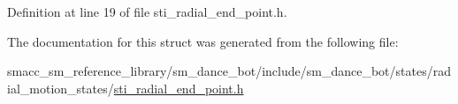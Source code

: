 Definition at line 19 of file sti\+\_\+radial\+\_\+end\+\_\+point.\+h.




The documentation for this struct was generated from the following file\+:\begin{DoxyCompactItemize}
\item 
smacc\+\_\+sm\+\_\+reference\+\_\+library/sm\+\_\+dance\+\_\+bot/include/sm\+\_\+dance\+\_\+bot/states/radial\+\_\+motion\+\_\+states/\hyperlink{include_2sm__dance__bot_2states_2radial__motion__states_2sti__radial__end__point_8h}{sti\+\_\+radial\+\_\+end\+\_\+point.\+h}\end{DoxyCompactItemize}
